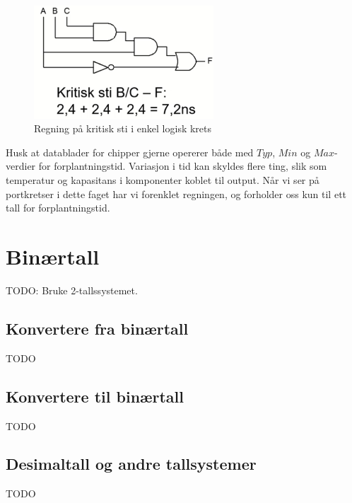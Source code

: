 \documentclass[12pt,a4paper,norsk]{article}
\begin{document}
\begin{figure}[hbt!]
  \centering
  \includegraphics[width=0.6\textwidth,height=\textheight,keepaspectratio]{Krets_DuringTeknomap}
  \caption{Regning på kritisk sti i enkel logisk krets\label{fig:kritisk_sti}}
\end{figure}

Husk at datablader for chipper gjerne opererer både med $Typ$, $Min$ og
$Max$-verdier for forplantningstid. Variasjon i tid kan skyldes flere ting, slik
som temperatur og kapasitans i komponenter koblet til output. Når vi ser på
portkretser i dette faget har vi forenklet regningen, og forholder oss kun til
ett tall for forplantningstid.

\section{Binærtall}
TODO\@: Bruke 2-tallssystemet.

\subsection{Konvertere fra binærtall}
TODO

\subsection{Konvertere til binærtall}
TODO

\subsection{Desimaltall og andre tallsystemer}
TODO
\end{document}
